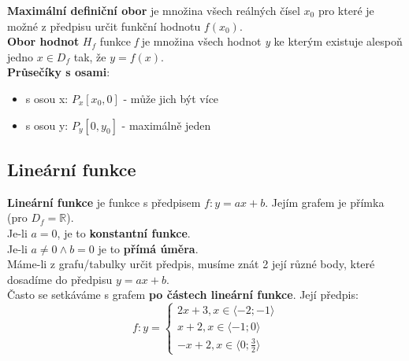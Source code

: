 \documentclass[12pt, a4paper]{article}
\begin{document}
\textbf{Maximální definiční obor} je množina všech reálných čísel $x_0$ pro které je možné z předpisu určit funkční hodnotu $f(x_0)$.\\
\textbf{Obor hodnot} $H_f$ funkce \textit{f} je množina všech hodnot \textit{y} ke kterým existuje alespoň jedno $x \in D_f$ tak, že $y=f(x)$. \\
\textbf{Průsečíky s osami}:
\begin{itemize}
\item s osou x: $P_x[x_0,0]$ - může jich být více
\item s osou y: $P_y[0,y_0]$ - maximálně jeden
\end{itemize}

\subsection*{Lineární funkce}
\textbf{Lineární funkce} je funkce s předpisem $f: y = ax+b$. Jejím grafem je přímka (pro $D_f = \mathbb{R}$).\\
Je-li $a=0$, je to \textbf{konstantní funkce}.\\
Je-li $a \neq 0 \land b = 0$ je to \textbf{přímá úměra}.\\
Máme-li z grafu/tabulky určit předpis, musíme znát 2 její různé body, které dosadíme do předpisu $y=ax+b$.\\
Často se setkáváme s grafem \textbf{po částech lineární funkce}. Její předpis: \\

\begin{equation}
f : y = 
\begin{cases}
2x+ 3, x \in \langle -2;-1 \rangle \\
x+2, x \in \langle -1; 0 \rangle \\
-x+2, x \in \langle 0; \frac{3}{2} \rangle
\end{cases}
\end{equation}
\end{document}
